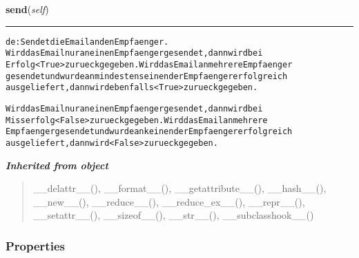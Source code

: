     \label{cuon:Email2:Email:send}

    \vspace{0.5ex}

\hspace{.8\funcindent}\begin{boxedminipage}{\funcwidth}

    \raggedright \textbf{send}(\textit{self})

    \vspace{-1.5ex}

    \rule{\textwidth}{0.5\fboxrule}
\setlength{\parskip}{2ex}
\begin{alltt}

de: Sendet die Email an den Empfaenger.
    Wird das Email nur an einen Empfaenger gesendet, dann wird bei
    Erfolg {\textless}True{\textgreater} zurueck gegeben. Wird das Email an mehrere Empfaenger
    gesendet und wurde an mindestens einen der Empfaenger erfolgreich
    ausgeliefert, dann wird ebenfalls {\textless}True{\textgreater} zurueck gegeben.
    
    Wird das Email nur an einen Empfaenger gesendet, dann wird bei
    Misserfolg {\textless}False{\textgreater} zurueck gegeben. Wird das Email an mehrere 
    Empfaenger gesendet und wurde an keinen der Empfaenger erfolgreich
    ausgeliefert, dann wird {\textless}False{\textgreater} zurueck gegeben.
\end{alltt}

\setlength{\parskip}{1ex}
    \end{boxedminipage}


\large{\textbf{\textit{Inherited from object}}}

\begin{quote}
\_\_delattr\_\_(), \_\_format\_\_(), \_\_getattribute\_\_(), \_\_hash\_\_(), \_\_new\_\_(), \_\_reduce\_\_(), \_\_reduce\_ex\_\_(), \_\_repr\_\_(), \_\_setattr\_\_(), \_\_sizeof\_\_(), \_\_str\_\_(), \_\_subclasshook\_\_()
\end{quote}


  \subsubsection{Properties}

